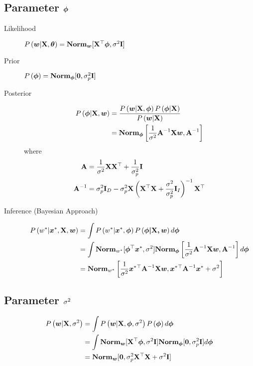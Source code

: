 \subsection*{Parameter $\vec{\ph}$}
	\begin{description}
		\item[Likelihood] $\P{\vec{w}|\mat{X},\vec{\th}}=\Norm_{\vec{w}}[\mat{X}\T\vec{\ph},\si^2\mat{I}]$
		\item[Prior] $\P{\vec{\ph}}=\Norm_{\vec{\ph}}[\vec{0},\si_p^2\mat{I}]$
		\item[Posterior] 
		\begin{align*}
			\P{\vec{\ph}|\mat{X},\vec{w}}&=\frac{\P{\vec{w}|\mat{X},\vec{\ph}}\P{\vec{\ph}|\mat{X}}}{\P{\vec{w}|\mat{X}}} \\
			&=\Norm_{\vec{\ph}}\left[\frac{1}{\si^2}\mat{A}\inv\mat{X}\vec{w},\mat{A}\inv\right]
		\end{align*}
		where
		\begin{align*}
			\mat{A}&=\frac{1}{\si^2}\mat{X}\mat{X}\T+\frac{1}{\si_p^2}\mat{I} \\
			\mat{A}\inv&=\si_p^2\mat{I}_D-\si_p^2\mat{X}\left(\mat{X}\T\mat{X}+\frac{\si^2}{\si_p^2}\mat{I}_I\right)\inv\mat{X}\T
		\end{align*}
		\item[Inference (Bayesian Approach)]
		\begin{align*}
			\P{w^*|\vec{x}^*,\mat{X},\vec{w}}&=\int\P{w^*|\vec{x}^*,\vec{\ph}}\P{\vec{\ph|\mat{X},\vec{w}}}d\vec{\ph} \\
			&=\int\Norm_{w^*}[\vec{\ph}\T\vec{x}^*,\si^2]\Norm_{\vec{\ph}}\left[\frac{1}{\si^2}\mat{A}\inv\mat{X}\vec{w},\mat{A}\inv\right]d\vec{\ph} \\
			&=\Norm_{w^*}\left[\frac{1}{\si^2}\vec{x}^*\T\mat{A}\inv\mat{X}\vec{w},\vec{x}^*\T\mat{A}\inv\vec{x}^*+\si^2\right]
		\end{align*}
	\end{description}

\subsection*{Parameter $\si^2$}
\begin{align*}
	\P{\vec{w}|\mat{X},\si^2}&=\int\P{\vec{w}|\mat{X},\vec{\ph},\si^2}\P{\vec{\ph}}d\vec{\ph} \\
	&=\int\Norm_{\vec{w}}[\mat{X}\T\vec{\ph},\si^2\mat{I}]\Norm_{\vec{\ph}}[\vec{0},\si_p^2\mat{I}]d\vec{\ph} \\
	&=\Norm_{\vec{w}}[\vec{0},\si_p^2\mat{X}\T\mat{X}+\si^2\mat{I}]
\end{align*}

